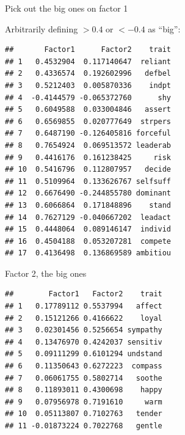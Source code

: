 \documentclass[ignorenonframetext,]{beamer}
\newenvironment{Shaded}{\begin{snugshade}}{\end{snugshade}}
\newcommand{\FloatTok}[1]{\textcolor[rgb]{0.00,0.00,0.81}{#1}}
\newcommand{\KeywordTok}[1]{\textcolor[rgb]{0.13,0.29,0.53}{\textbf{#1}}}
\newcommand{\NormalTok}[1]{#1}
\newcommand{\OperatorTok}[1]{\textcolor[rgb]{0.81,0.36,0.00}{\textbf{#1}}}
\newcommand{\StringTok}[1]{\textcolor[rgb]{0.31,0.60,0.02}{#1}}
\begin{document}
\begin{frame}[fragile]{Pick out the big ones on factor 1}
\protect\hypertarget{pick-out-the-big-ones-on-factor-1}{}

Arbitrarily defining \(>0.4\) or \(<-0.4\) as ``big'':

\scriptsize

\begin{Shaded}
\end{Shaded}

\begin{verbatim}
##       Factor1      Factor2    trait
## 1   0.4532904  0.117140647  reliant
## 2   0.4336574  0.192602996   defbel
## 3   0.5212403  0.005870336    indpt
## 4  -0.4144579 -0.065372760      shy
## 5   0.6049588  0.033004846   assert
## 6   0.6569855  0.020777649  strpers
## 7   0.6487190 -0.126405816 forceful
## 8   0.7654924  0.069513572 leaderab
## 9   0.4416176  0.161238425     risk
## 10  0.5416796  0.112807957   decide
## 11  0.5109964  0.133626767 selfsuff
## 12  0.6676490 -0.244855780 dominant
## 13  0.6066864  0.171848896    stand
## 14  0.7627129 -0.040667202  leadact
## 15  0.4448064  0.089146147  individ
## 16  0.4504188  0.053207281  compete
## 17  0.4136498  0.136869589 ambitiou
\end{verbatim}

\normalsize

\end{frame}

\begin{frame}[fragile]{Factor 2, the big ones}
\protect\hypertarget{factor-2-the-big-ones}{}

\footnotesize

\begin{Shaded}
\end{Shaded}

\begin{verbatim}
##        Factor1   Factor2    trait
## 1   0.17789112 0.5537994   affect
## 2   0.15121266 0.4166622    loyal
## 3   0.02301456 0.5256654 sympathy
## 4   0.13476970 0.4242037 sensitiv
## 5   0.09111299 0.6101294 undstand
## 6   0.11350643 0.6272223  compass
## 7   0.06061755 0.5802714   soothe
## 8   0.11893011 0.4300698    happy
## 9   0.07956978 0.7191610     warm
## 10  0.05113807 0.7102763   tender
## 11 -0.01873224 0.7022768   gentle
\end{verbatim}

\normalsize

\end{frame}
\end{document}
